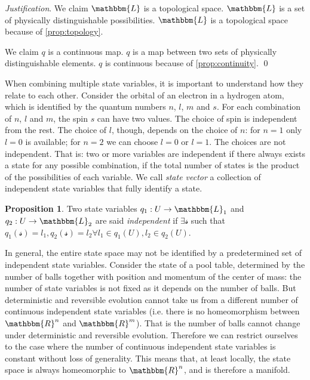\documentclass[aps,pra,10pt,twocolumn,floatfix,nofootinbib]{revtex4-1}
\numberwithin{equation}{section}
\theoremstyle{definition}
\newtheorem{prop}[equation]{Proposition}
\newenvironment{justification}{\emph{Justification}.}{\qed}
\begin{document}
\begin{justification}
	We claim $\mathbbm{L}$ is a topological space. $\mathbbm{L}$ is a set of physically distinguishable possibilities. $\mathbbm{L}$ is a topological space because of \ref{prop:topology}.
	
	We claim $q$ is a continuous map. $q$ is a map between two sets of physically distinguishable elements. $q$ is continuous because of \ref{prop:continuity}.
\end{justification}

When combining multiple state variables, it is important to understand how they relate to each other. Consider the orbital of an electron in a hydrogen atom, which is identified by the quantum numbers $n$, $l$, $m$ and $s$. For each combination of $n$, $l$ and $m$, the spin $s$ can have two values. The choice of spin is independent from the rest. The choice of $l$, though, depends on the choice of $n$: for $n=1$ only $l=0$ is available; for $n=2$ we can choose $l=0$ or $l=1$. The choices are not independent. That is: two or more variables are independent if there always exists a state for any possible combination, if the total number of states is the product of the possibilities of each variable. We call \emph{state vector} a collection of independent state variables that fully identify a state.

\begin{prop}\label{prop:independent_state_variables}
	Two state variables $q_1 : U \rightarrow \mathbbm{L}_1$ and $q_2 : U \rightarrow \mathbbm{L}_2$ are said \emph{independent} if $\exists \mathcal{s}$ such that $q_1(\mathcal{s})=l_1, q_2(\mathcal{s})=l_2 \forall l_1 \in q_1(U), l_2 \in q_2(U)$.
\end{prop}

In general, the entire state space may not be identified by a predetermined set of independent state variables. Consider the state of a pool table, determined by the number of balls together with position and momentum of the center of mass: the number of state variables is not fixed as it depends on the number of balls. But deterministic and reversible evolution cannot take us from a different number of continuous independent state variables (i.e. there is no homeomorphism between $\mathbbm{R}^n$ and $\mathbbm{R}^m$). That is the number of balls cannot change under deterministic and reversible evolution. Therefore we can restrict ourselves to the case where the number of continuous independent state variables is constant without loss of generality. This means that, at least locally, the state space is always homeomorphic to $\mathbbm{R}^n$, and is therefore a manifold.
\end{document}
